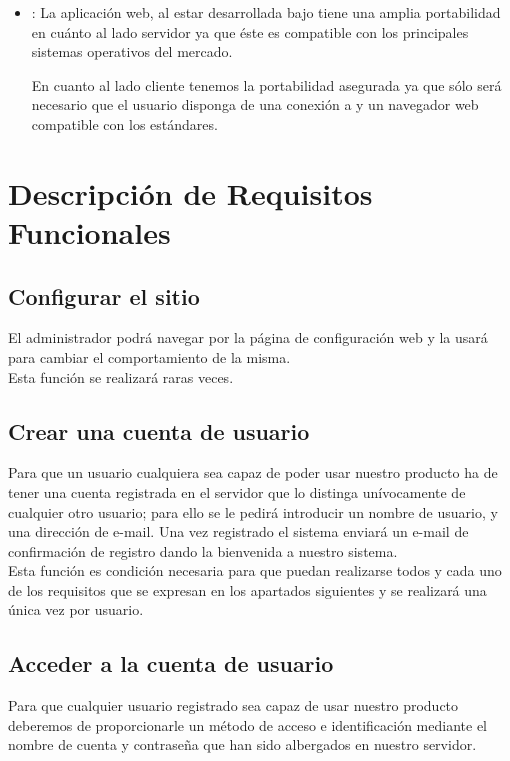 \begin{itemize}
\item {}: La aplicación web, al estar desarrollada bajo
   tiene una amplia portabilidad en cuánto al lado
  servidor ya que éste es compatible con los principales sistemas operativos del
  mercado.

  En cuanto al lado cliente tenemos la portabilidad asegurada ya que sólo será
  necesario que el usuario disponga de una conexión a  y un
  navegador web compatible con los estándares.
\end{itemize}

\section{Descripción de Requisitos Funcionales}

\subsection{Configurar el sitio}
El administrador podrá navegar por la página de configuración web y la
usará para cambiar el comportamiento de la misma.\\

Esta función se realizará raras veces.
\subsection{Crear una cuenta de usuario}
Para que un usuario cualquiera sea capaz de poder usar nuestro producto ha de
tener una cuenta registrada en el servidor que lo distinga unívocamente de
cualquier otro usuario; para ello se le pedirá introducir un nombre de usuario,
y una dirección de e-mail. Una vez registrado el sistema enviará un e-mail de
confirmación de
registro dando la bienvenida a nuestro sistema.\\

Esta función es condición necesaria para que puedan realizarse todos y cada uno
de los requisitos que se expresan en los apartados siguientes y se realizará una
única vez por usuario.

\subsection{Acceder a la cuenta de usuario}
Para que cualquier usuario registrado sea capaz de usar nuestro producto
deberemos de proporcionarle un método de acceso e identificación mediante el
nombre de cuenta y contraseña que han sido
albergados en nuestro servidor.\\

